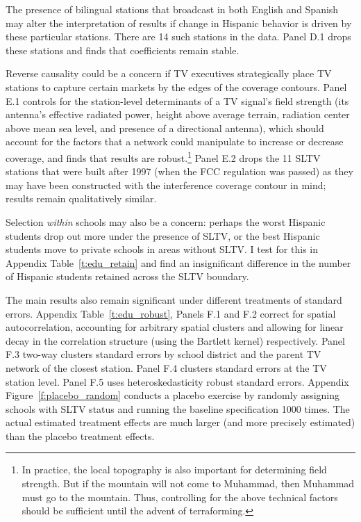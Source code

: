 \documentclass[11pt]{article}
\begin{document}
The presence of bilingual stations that broadcast in both English and Spanish may alter the interpretation of results if change in Hispanic behavior is driven by these particular stations. There are 14 such stations in the data. Panel D.1 drops these stations and finds that coefficients remain stable. 

Reverse causality could be a concern if TV executives strategically place TV stations to capture certain markets by the edges of the coverage contours. Panel E.1 controls for the station-level determinants of a TV signal's field strength (its antenna's effective radiated power, height above average terrain, radiation center above mean sea level, and presence of a directional antenna), which should account for the factors that a network could manipulate to increase or decrease coverage, and finds that results are robust.\footnote{In practice, the local topography is also important for determining field strength. But if the mountain will not come to Muhammad, then Muhammad must go to the mountain. Thus, controlling for the above technical factors should be sufficient until the advent of terraforming.} Panel E.2 drops the 11 SLTV stations that were built after 1997 (when the FCC regulation was passed) as they may have been constructed with the interference coverage contour in mind; results remain qualitatively similar.

Selection \textit{within} schools may also be a concern: perhaps the worst Hispanic students drop out more under the presence of SLTV, or the best Hispanic students move to private schools in areas without SLTV. I test for this in Appendix Table~\ref{t:edu_retain} and find an insignificant difference in the number of Hispanic students retained across the SLTV boundary.

The main results also remain significant under different treatments of standard errors. Appendix Table~\ref{t:edu_robust}, Panels F.1 and F.2 correct for spatial autocorrelation, accounting for arbitrary spatial clusters and allowing for linear decay in the correlation structure (using the Bartlett kernel) respectively. Panel F.3 two-way clusters standard errors by school district and the parent TV network of the closest station. Panel F.4 clusters standard errors at the TV station level. Panel F.5 uses heteroskedasticity robust standard errors. Appendix Figure~\ref{f:placebo_random} conducts a placebo exercise by randomly assigning schools with SLTV status and running the baseline specification 1000 times. The actual estimated treatment effects are much larger (and more precisely estimated) than the placebo treatment effects.
\end{document}
